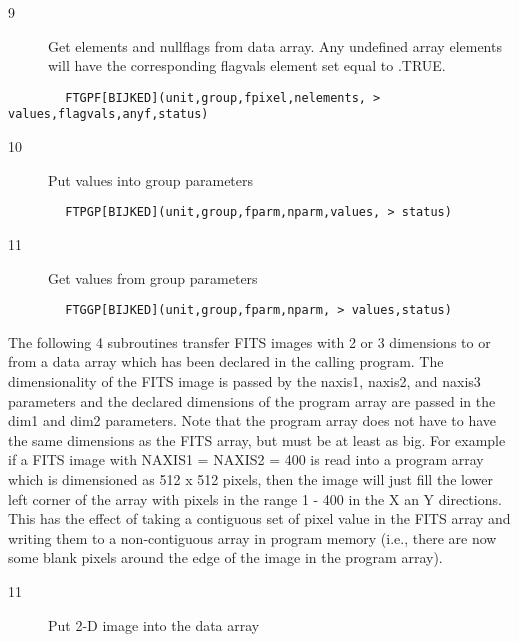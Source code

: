 \documentclass[11pt]{book}
\begin{document}
\begin{description}
\item[9 ] Get elements and nullflags from data array.
    Any undefined array elements will have the corresponding flagvals element
   set equal to .TRUE.
\end{description}

\begin{verbatim}
        FTGPF[BIJKED](unit,group,fpixel,nelements, > values,flagvals,anyf,status)
\end{verbatim}

\begin{description}
\item[10]  Put values into group parameters
\end{description}

\begin{verbatim}
        FTPGP[BIJKED](unit,group,fparm,nparm,values, > status)
\end{verbatim}

\begin{description}
\item[11]  Get values from group parameters
\end{description}

\begin{verbatim}
        FTGGP[BIJKED](unit,group,fparm,nparm, > values,status)
\end{verbatim}
The following 4 subroutines transfer FITS images with 2 or 3 dimensions
to or from a data array which has been declared in the calling program.
The dimensionality of the FITS image is passed by the naxis1, naxis2,
and naxis3 parameters and the declared dimensions of the program array
are passed in the dim1 and dim2 parameters.  Note that the program array
does not have to have the same dimensions as the FITS array, but must
be at least as big.  For example if a FITS image with NAXIS1 = NAXIS2 = 400
is read into a program array which is dimensioned as 512 x 512 pixels,
then the image will just fill the lower left corner of the array
with pixels in the range 1 - 400 in the X an Y directions.  This has
the effect of taking a contiguous set of pixel value in the FITS array
and writing them to a non-contiguous array in program memory
(i.e., there are now some blank pixels around the edge of the image
in the program array).


\begin{description}
\item[11]  Put 2-D image into the data array
\end{description}
\end{document}
